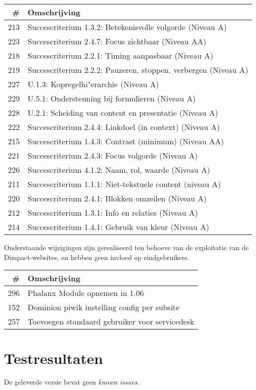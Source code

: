 \documentclass[12pt]{article}
\begin{document}
\begin{tabular}{| r | p{15cm} |}
	\hline \# & Omschrijving \\ \hline \hline
	213 & Succescriterium 1.3.2: Betekenisvolle volgorde (Niveau A) \\ \hline
	223 & Succescriterium 2.4.7: Focus zichtbaar (Niveau AA) \\ \hline
	218 & Succescriterium 2.2.1: Timing aanpasbaar (Niveau A) \\ \hline 
	219 & Succescriterium 2.2.2: Pauzeren, stoppen, verbergen
		(Niveau A) \\ \hline 
	227 & U.1.3: Kopregelhi"erarchie (Niveau A) \\ \hline
	229 & U.5.1: Ondersteuning bij formulieren (Niveau A) \\ \hline
	228 & U.2.1: Scheiding van content en presentatie (Niveau A) \\ \hline
	222 & Succescriterium 2.4.4: Linkdoel (in context) (Niveau A) \\ \hline
	215 & Succescriterium 1.4.3: Contrast (minimum) (Niveau AA) \\ \hline
	221 & Succescriterium 2.4.3: Focus volgorde (Niveau A) \\ \hline
	226 & Succescriterium 4.1.2: Naam, rol, waarde (Niveau A) \\ \hline
	211 & Succescriterium 1.1.1: Niet-tekstuele content (niveau A) \\ \hline
	220 & Succescriterium 2.4.1: Blokken omzeilen (Niveau A) \\ \hline
	212 & Succescriterium 1.3.1: Info en relaties (Niveau A) \\ \hline
	214 & Succescriterium 1.4.1: Gebruik van kleur (Niveau A) \\ \hline
\end{tabular}

Onderstaande wijzigingen zijn gerealiseerd ten behoeve van de exploitatie van de Dimpact-websites, en hebben geen invloed op eindgebruikers.

\begin{tabular}{| r | p{15cm} |}
	\hline \# & Omschrijving \\ \hline \hline
	296 & Phalanx Module opnemen in 1.06 \\ \hline
	152 & Dominion piwik instelling config per subsite \\ \hline
	257 & Toevoegen standaard gebruiker voor servicedesk \\ \hline
\end{tabular}

\section{Testresultaten}
De geleverde versie bevat geen \emph{known issues}.
\end{document}
